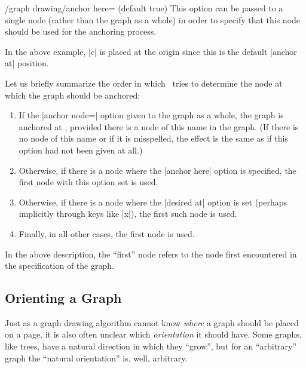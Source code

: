 \begin{key}{/graph drawing/anchor here= (default true)}
  This option can be passed to a single node (rather than the graph as
  a whole) in order to specify that this node should be used for the
  anchoring process.
\begin{codeexample}[]
\end{codeexample}
  In the above example, |c| is placed at the origin since this is the
  default |anchor at| position.
\end{key}

Let us briefly summarize the order in which \tikzname\ tries to
determine the node at which the graph should be anchored:
\begin{enumerate}
\item If the |anchor node=| option given to the graph
  as a whole, the graph is anchored at , provided
  there is a node of this name in the graph. (If there is no node of
  this name or if it is misspelled, the effect is the same as if this
  option had not been given at all.)
\item Otherwise, if there is a node where the |anchor here| option is
  specified, the first node with this option set is used.
\item Otherwise, if there is a node where the |desired at| option is
  set (perhaps implicitly through keys like |x|), the first such node
  is used.
\item Finally, in all other cases, the first node is used.
\end{enumerate}

In the above description, the ``first'' node refers to the node first
encountered in the specification of the graph.



\subsection{Orienting a Graph}

\label{subsection-library-graphdrawing-standard-orientation}

Just as a graph drawing algorithm cannot know \emph{where} a graph
should be placed on a page, it is also often unclear which
\emph{orientation} it should have. Some graphs, like trees, have a
natural direction in which they ``grow'', but for an ``arbitrary''
graph the ``natural orientation'' is, well, arbitrary.


